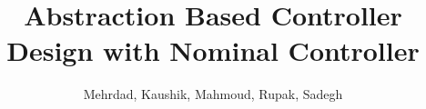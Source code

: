 \documentclass[sigconf,review]{acmart}
\title{Abstraction Based Controller Design with Nominal Controller}
\author{Mehrdad, Kaushik, Mahmoud, Rupak, Sadegh}
\begin{document}
\begin{abstract}
	
\end{abstract}

\maketitle



	 





\end{document}
